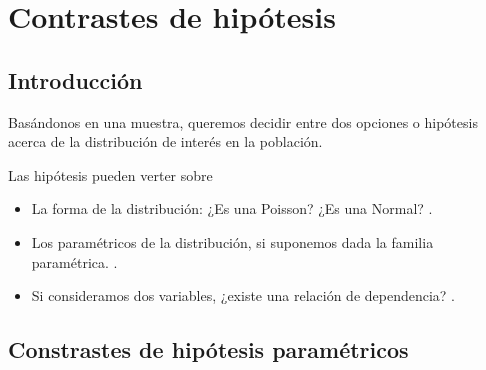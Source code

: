 \section{Contrastes de hipótesis}
\subsection{Introducción}
Basándonos en una muestra, queremos decidir entre dos opciones o hipótesis acerca de la distribución de interés en la población.

Las hipótesis pueden verter sobre
\begin{itemize}[label=\textbullet]
    \item La forma de la distribución: ¿Es una Poisson? ¿Es una Normal? .
    \item Los paramétricos de la distribución, si suponemos dada la familia paramétrica. .
    \item Si consideramos dos variables, ¿existe una relación de dependencia? .
\end{itemize}
\subsection{Constrastes de hipótesis paramétricos}
